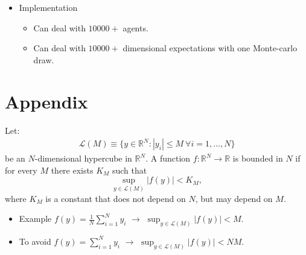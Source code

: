 \documentclass[aspectratio=169,10pt]{beamer}
\begin{document}
\begin{frame}
\begin{itemize}
				\item Implementation\vspace{0.1in}
				\begin{itemize}
					\item Can deal with $10000+$ agents.\vspace{0.1in}
					\smallskip
					\item Can deal with $10000+$ dimensional expectations with one Monte-carlo draw.\vspace{0.1in}
					\smallskip
				\end{itemize}
			\end{itemize}
			\end{frame}



\section{Appendix}



\begin{frame}
	\begin{definition}
		Let:
		\begin{align*}
			\mathcal{L}(M) \equiv \{y \in \mathbb{R}^N: |y_i|\leq M ~\forall i = 1,\dots,N\}
		\end{align*}
	be an $N$-dimensional hypercube in $\mathbb{R}^N$. A function $f: \mathbb{R}^N\rightarrow \mathbb{R}$ is bounded in $N$ if for every $M$ there exists $K_M$ such that 
	\begin{equation*}
		\sup_{y\in \mathcal{L}(M)} |f(y)| < K_M,
	\end{equation*}
	where $K_M$ is a constant that does not depend on $N$, but may depend on $M$.
	\end{definition}
\begin{itemize}
	\item Example $f(y) = \frac{1}{N}\sum_{i=1}^N y_i$ $\rightarrow$ $\sup_{y\in \mathcal{L}(M)} |f(y)| < M$.\vspace{0.1in}
	\item To avoid $f(y) = \sum_{i=1}^N y_i$ $\rightarrow$ $\sup_{y\in \mathcal{L}(M)} |f(y)| < NM$.
\end{itemize}
\hyperlink{concentration}{}
\end{frame}
\end{document}
